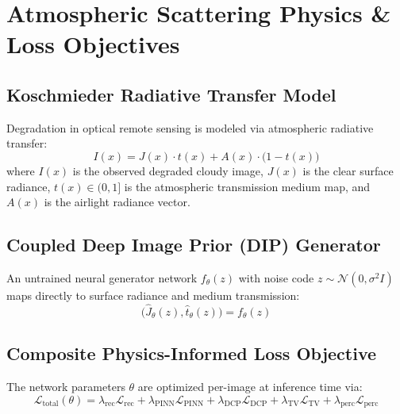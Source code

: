 \documentclass[11pt,a4paper]{article}
\begin{document}
\newpage
\section{Atmospheric Scattering Physics \& Loss Objectives}

\subsection{Koschmieder Radiative Transfer Model}
Degradation in optical remote sensing is modeled via atmospheric radiative transfer:
\begin{equation}
    I(x) = J(x) \cdot t(x) + A(x) \cdot \big(1 - t(x)\big)
\end{equation}
where $I(x)$ is the observed degraded cloudy image, $J(x)$ is the clear surface radiance, $t(x) \in (0, 1]$ is the atmospheric transmission medium map, and $A(x)$ is the airlight radiance vector.

\subsection{Coupled Deep Image Prior (DIP) Generator}
An untrained neural generator network $f_\theta(z)$ with noise code $z \sim \mathcal{N}(0, \sigma^2 I)$ maps directly to surface radiance and medium transmission:
\begin{equation}
    \big(\hat{J}_\theta(z), \hat{t}_\theta(z)\big) = f_\theta(z)
\end{equation}

\subsection{Composite Physics-Informed Loss Objective}
The network parameters $\theta$ are optimized per-image at inference time via:
\begin{equation}
    \mathcal{L}_{\text{total}}(\theta) = \lambda_{\text{rec}} \mathcal{L}_{\text{rec}} + \lambda_{\text{PINN}} \mathcal{L}_{\text{PINN}} + \lambda_{\text{DCP}} \mathcal{L}_{\text{DCP}} + \lambda_{\text{TV}} \mathcal{L}_{\text{TV}} + \lambda_{\text{perc}} \mathcal{L}_{\text{perc}}
\end{equation}
\end{document}
